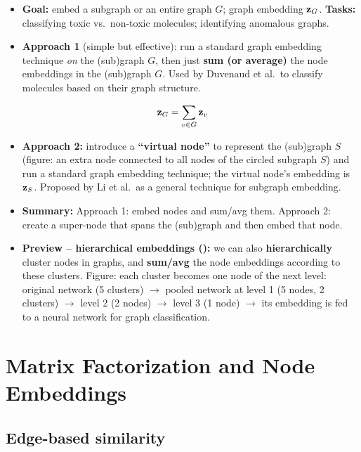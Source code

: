 \begin{itemize}
  \item \textbf{Goal:} embed a subgraph or an entire graph $G$; graph embedding
    $\mathbf{z}_G$. \textbf{Tasks:} classifying toxic vs.\ non-toxic molecules;
    identifying anomalous graphs.
  \item \textbf{Approach 1} (simple but effective): run a standard graph
    embedding technique \emph{on} the (sub)graph $G$, then just \textbf{sum (or
    average)} the node embeddings in the (sub)graph $G$. Used by Duvenaud et al.\
    to classify molecules based on their graph structure.
\end{itemize}
\begin{equation}\label{eq:lec02-sumpool}
  \mathbf{z}_G=\sum_{v\in G}\mathbf{z}_v
\end{equation}
\begin{itemize}
  \item \textbf{Approach 2:} introduce a \textbf{``virtual node''} to represent
    the (sub)graph $S$ (figure: an extra node connected to all nodes of the
    circled subgraph $S$) and run a standard graph embedding technique; the
    virtual node's embedding is $\mathbf{z}_S$. Proposed by Li et al.\ as a
    general technique for subgraph embedding.
  \item \textbf{Summary:} Approach 1: embed nodes and sum/avg them. Approach 2:
    create a super-node that spans the (sub)graph and then embed that node.
  \item \textbf{Preview -- hierarchical embeddings (\term{DiffPool}):} we can also
    \textbf{hierarchically} cluster nodes in graphs, and \textbf{sum/avg} the node
    embeddings according to these clusters. Figure: each cluster becomes one
    node of the next level: original network (5 clusters) $\to$ pooled network at
    level 1 (5 nodes, 2 clusters) $\to$ level 2 (2 nodes) $\to$ level 3 (1 node)
    $\to$ its embedding is fed to a neural network for graph classification.
\end{itemize}

\section{Matrix Factorization and Node Embeddings}\label{sec:lec02-mf}

\subsection{Edge-based similarity}\label{sec:lec02-mf-adj}


